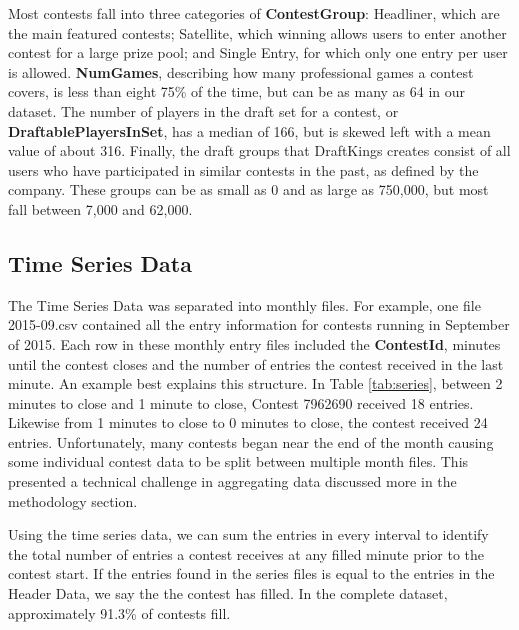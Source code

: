 Most contests fall into three categories of \textbf{ContestGroup}: Headliner, which are the main featured contests; Satellite, which winning allows users to enter another contest for a large prize pool; and Single Entry, for which only one entry per user is allowed. \textbf{NumGames}, describing how many professional games a contest covers, is less than eight 75\% of the time, but can be as many as 64 in our dataset. The number of players in the draft set for a contest, or \textbf{DraftablePlayersInSet}, has a median of 166, but is skewed left with a mean value of about 316. Finally, the draft groups that DraftKings creates consist of all users who have participated in similar contests in the past, as defined by the company. These groups can be as small as 0 and as large as 750,000, but most fall between 7,000 and 62,000. \newline


\subsection{Time Series Data}

The Time Series Data was separated into monthly files. For example, one file 2015-09.csv contained all the entry information for contests running in September of 2015. Each row in these monthly entry files included the \textbf{ContestId}, minutes until the contest closes and the number of entries the contest received in the last minute. An example best explains this structure. In Table \ref{tab:series}, between 2 minutes to close and 1 minute to close, Contest 7962690 received 18 entries. Likewise from 1 minutes to close to 0 minutes to close, the contest received 24 entries. Unfortunately, many contests began near the end of the month causing some individual contest data to be split between multiple month files. This presented a technical challenge in aggregating data discussed more in the methodology section.

Using the time series data, we can sum the entries in every interval to identify the total number of entries a contest receives at any filled minute prior to the contest start. If the entries found in the series files is equal to the entries in the Header Data, we say the the contest has filled. In the complete dataset, approximately 91.3\% of contests fill. 

